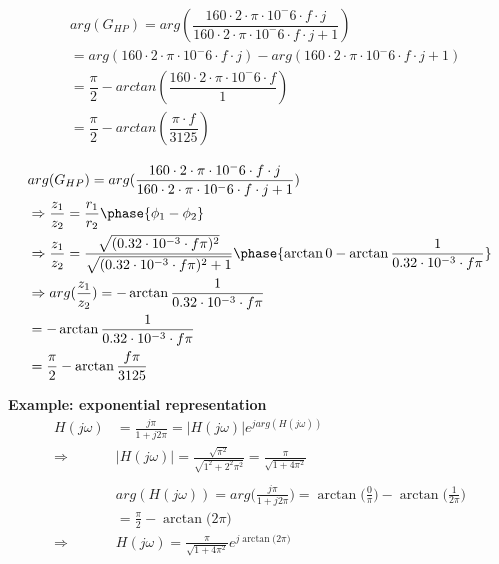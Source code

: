 \documentclass{article}
\begin{document}
\begin{align*}
    &arg(G_{HP})=arg(\dfrac{160 \cdot 2 \cdot \pi \cdot 10^-6 \cdot f \cdot j}{160 \cdot 2 \cdot \pi \cdot 10^-6 \cdot f \cdot j + 1}) \\
    &= arg(160 \cdot 2 \cdot \pi \cdot 10^-6 \cdot f \cdot j) - arg(160 \cdot 2 \cdot \pi \cdot 10^-6 \cdot f \cdot j + 1)\\
    &=\dfrac{\pi}{2} - arctan(\dfrac{160 \cdot 2 \cdot \pi \cdot 10^-6 \cdot f}{1})\\
    &=\dfrac{\pi}{2} - arctan(\dfrac{\pi \cdot f}{3125})
\end{align*}

\begin{align*}
    &arg(G_{HP})=arg(\dfrac{160 \cdot 2 \cdot \pi \cdot 10^-6 \cdot f \cdot j}{160 \cdot 2 \cdot \pi \cdot 10^-6 \cdot f \cdot j + 1}) \\
    &\Rightarrow \dfrac{z_1}{z_2} = \frac{r_1}{r_2}\phase{\phi_1-\phi_2}  \\
    &\Rightarrow \dfrac{z_1}{z_2} = \frac{\sqrt{(0.32 \cdot 10^{-3} \cdot f\pi)^2}}{\sqrt{(0.32 \cdot 10^{-3} \cdot f\pi)^2 + 1}}\phase{\arctan{0}-\arctan{\frac{1}{0.32 \cdot 10^{-3} \cdot f\pi}}}  \\
    &\Rightarrow arg(\dfrac{z_1}{z_2}) = -\arctan{\frac{1}{0.32 \cdot 10^{-3} \cdot f\pi}}  \\
    &= -\arctan{\frac{1}{0.32 \cdot 10^{-3} \cdot f\pi}}  \\
    &= \frac{\pi}{2}-\arctan{\frac{f\pi}{3125}}  \\
\end{align*}


\textbf{Example: exponential representation}
\begin{align*}
    H(j\omega) &= \frac{j\pi}{1+j2\pi} = |H(j\omega)| e^{j arg(H(j\omega))} \\
    \Rightarrow &|H(j\omega)| = \frac{\sqrt{\pi^2}}{\sqrt{1^2+2^2\pi^2}}
    = \frac{\pi}{\sqrt{1+4\pi^2}} \\
    &\\
    &arg(H(j\omega)) = arg\Big(\frac{j\pi}{1+j2\pi}\Big)= \arctan{\Big(\frac{0}{\pi}\Big)}-\arctan{\Big(\frac{1}{2\pi}\Big)} \\
    &= \frac{\pi}{2} -\arctan{\Big(2\pi\Big)} \\
    \Rightarrow &H(j\omega) = \frac{\pi}{\sqrt{1+4\pi^2}}e^{j\arctan{\Big(2\pi\Big)}} \\
\end{align*}
\end{document}
